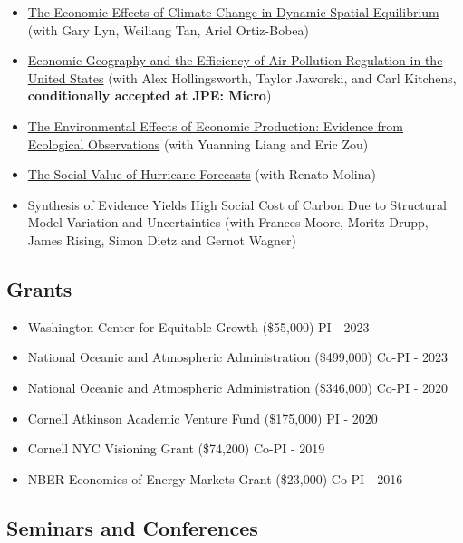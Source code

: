 \documentclass[12pt]{res} %
\begin{document}
\begin{resume}
\begin{itemize} %
	\item[] \href{https://osf.io/preprints/socarxiv/usghb}{The Economic Effects of Climate Change in Dynamic Spatial Equilibrium} (with Gary Lyn, Weiliang Tan, Ariel Ortiz-Bobea)
	\item[]\href{https://osf.io/preprints/socarxiv/x6fuw/}{Economic Geography and the Efficiency of Air Pollution Regulation in the United States} (with Alex Hollingsworth, Taylor Jaworski, and Carl Kitchens, \textbf{conditionally accepted at JPE: Micro})
	\item[] \href{https://osf.io/preprints/socarxiv/qy76a}{The Environmental Effects of Economic Production: Evidence from Ecological Observations} (with Yuanning Liang and Eric Zou)
	\item[] \href{https://ivanrudik.com}{The Social Value of Hurricane Forecasts} (with Renato Molina)
	\item[] Synthesis of Evidence Yields High Social Cost of Carbon Due to Structural Model Variation and Uncertainties (with Frances Moore, Moritz Drupp, James Rising, Simon Dietz and Gernot Wagner)
\end{itemize}
 
\vspace{-.2in}

\subsection{Grants}
\begin{itemize}  \itemsep -1pt
	\item[] Washington Center for Equitable Growth (\$55,000) \hfill PI - 2023
	\item[] National Oceanic and Atmospheric Administration (\$499,000) \hfill Co-PI - 2023
	\item[] National Oceanic and Atmospheric Administration (\$346,000) \hfill Co-PI - 2020
	\item[] Cornell Atkinson Academic Venture Fund (\$175,000) \hfill PI - 2020
	\item[] Cornell NYC Visioning Grant (\$74,200) \hfill Co-PI - 2019
	\item[] NBER Economics of Energy Markets Grant (\$23,000) \hfill Co-PI - 2016
\end{itemize}

\vspace{-.2in}

\subsection{Seminars and Conferences}\vspace{-.1in}

\end{resume}
\end{document}

